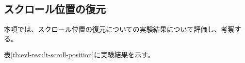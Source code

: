 \subsection{スクロール位置の復元}
本項では、スクロール位置の復元についての実験結果について評価し、考察する。













表\ref{tb:evl-result-scroll-position}に実験結果を示す。

